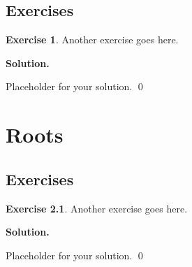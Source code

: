 \documentclass[12pt]{book}
\theoremstyle{definition}
\newtheorem{exercise}{Exercise}[chapter]
\newenvironment{solution}
{%
  \par\noindent\textbf{Solution.}\quad
}
{%
  \qed\par
}
\begin{document}
\section{Exercises}

\begin{exercise}
Another exercise goes here.
\end{exercise}

\begin{solution}
Placeholder for your solution.
\end{solution}

\chapter{Roots}
\section{Exercises}

\begin{exercise}
Another exercise goes here.
\end{exercise}

\begin{solution}
Placeholder for your solution.
\end{solution}

\end{document}
